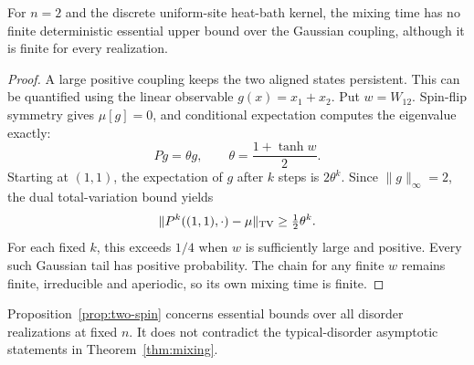 \begin{proposition}\label{prop:two-spin}
For $n=2$ and the discrete uniform-site heat-bath kernel, the mixing time has no finite deterministic essential upper bound over the Gaussian coupling, although it is finite for every realization.
\end{proposition}
\begin{proof}
A large positive coupling keeps the two aligned states persistent.
This can be quantified using the linear observable $g(x)=x_1+x_2$.
Put $w=W_{12}$. Spin-flip symmetry gives $\mu[g]=0$, and conditional
expectation computes the eigenvalue exactly:
\[
 Pg=\theta g,\qquad \theta=\frac{1+\tanh w}{2}.
\]
Starting at $(1,1)$, the expectation of $g$ after $k$ steps is $2\theta^k$. Since $\|g\|_\infty=2$, the dual total-variation bound yields
\[
 \|P^k((1,1),\cdot)-\mu\|_{\mathrm{TV}}\ge\tfrac12\theta^k.
\]
For each fixed $k$, this exceeds $1/4$ when $w$ is sufficiently large and positive. Every such Gaussian tail has positive probability. The chain for any finite $w$ remains finite, irreducible and aperiodic, so its own mixing time is finite.
\end{proof}

Proposition~\ref{prop:two-spin} concerns essential bounds over all disorder realizations at fixed $n$. It does not contradict the typical-disorder asymptotic statements in Theorem~\ref{thm:mixing}.
